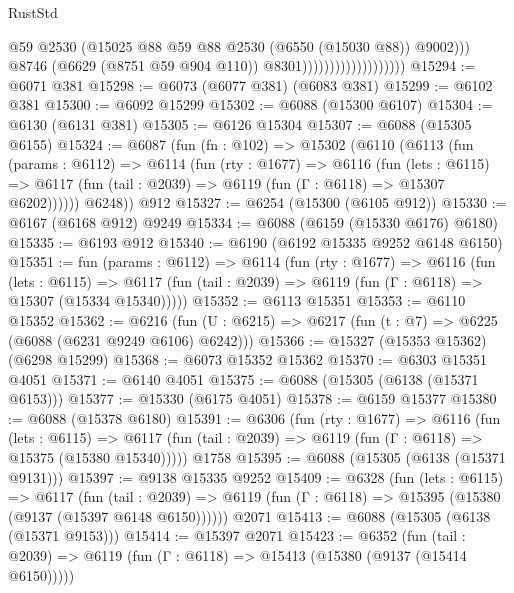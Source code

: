 \begin{lexlean}{RustStd}
\begin{coremodule}
                                              @59
                                              @2530
                                              (@15025
                                                @88
                                                @59
                                                @88
                                                @2530
                                                (@6550 (@15030 @88))
                                                @9002)))
                                          @8746
                                          (@6629 (@8751 @59 @904 @110))
                                          @8301)))))))))))))))))))
@15294 := @6071 @381
@15298 := @6073 (@6077 @381) (@6083 @381)
@15299 := @6102 @381
@15300 := @6092 @15299
@15302 := @6088 (@15300 @6107)
@15304 := @6130 (@6131 @381)
@15305 := @6126 @15304
@15307 := @6088 (@15305 @6155)
@15324 := @6087
    (fun (fn : @102) =>
    @15302
      (@6110
        (@6113
          (fun (params : @6112) =>
          @6114
            (fun (rty : @1677) =>
            @6116
              (fun (lets : @6115) =>
              @6117 (fun (tail : @2039) => @6119 (fun (Γ : @6118) => @15307 @6202))))))
        @6248))
    @912
@15327 := @6254 (@15300 (@6105 @912))
@15330 := @6167 (@6168 @912) @9249
@15334 := @6088 (@6159 (@15330 @6176) @6180)
@15335 := @6193 @912
@15340 := @6190 (@6192 @15335 @9252 @6148 @6150)
@15351 := fun (params : @6112) =>
  @6114
    (fun (rty : @1677) =>
    @6116
      (fun (lets : @6115) =>
      @6117 (fun (tail : @2039) => @6119 (fun (Γ : @6118) => @15307 (@15334 @15340)))))
@15352 := @6113 @15351
@15353 := @6110 @15352
@15362 := @6216 (fun (U : @6215) => @6217 (fun (t : @7) => @6225 (@6088 (@6231 @9249 @6106) @6242)))
@15366 := @15327 (@15353 @15362) (@6298 @15299)
@15368 := @6073 @15352 @15362
@15370 := @6303 @15351 @4051
@15371 := @6140 @4051
@15375 := @6088 (@15305 (@6138 (@15371 @6153)))
@15377 := @15330 (@6175 @4051)
@15378 := @6159 @15377
@15380 := @6088 (@15378 @6180)
@15391 := @6306
    (fun (rty : @1677) =>
    @6116
      (fun (lets : @6115) =>
      @6117 (fun (tail : @2039) => @6119 (fun (Γ : @6118) => @15375 (@15380 @15340)))))
    @1758
@15395 := @6088 (@15305 (@6138 (@15371 @9131)))
@15397 := @9138 @15335 @9252
@15409 := @6328
    (fun (lets : @6115) =>
    @6117
      (fun (tail : @2039) =>
      @6119 (fun (Γ : @6118) => @15395 (@15380 (@9137 (@15397 @6148 @6150))))))
    @2071
@15413 := @6088 (@15305 (@6138 (@15371 @9153)))
@15414 := @15397 @2071
@15423 := @6352
    (fun (tail : @2039) => @6119 (fun (Γ : @6118) => @15413 (@15380 (@9137 (@15414 @6150)))))

\end{coremodule}
\end{lexlean}
